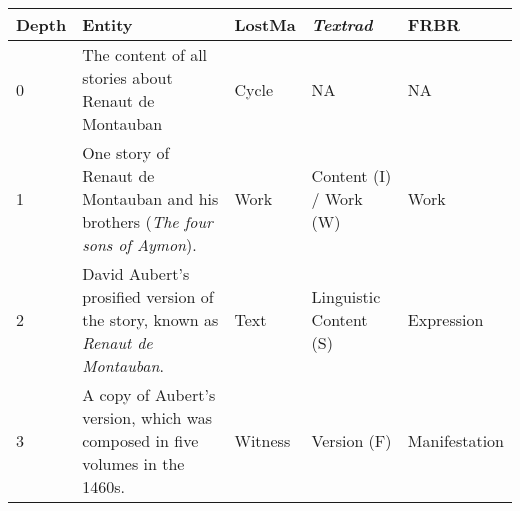 \begin{center}
    \begin{tabular}
        {|p{}|p{}|p{}|p{}|p{}|}
        \hline
        \textbf{Depth} & \textbf{Entity} & \textbf{LostMa} & \textbf{\textit{Textrad}} & \textbf{FRBR} \\
        \hline
        0 & The content of all stories about Renaut de Montauban & Cycle & NA & NA \\
        \hline
        1 & One story of Renaut de Montauban and his brothers (\textit{The four sons of Aymon}). & Work & Content (I) / Work (W) & Work \\
        \hline
        2 & David Aubert's prosified version of the story, known as \textit{Renaut de Montauban}. & Text & Linguistic Content (S) & Expression  \\
        \hline
        3 & A copy of Aubert's version, which was composed in five volumes in the 1460s. & Witness & Version (F) & Manifestation \\
        \hline
    \end{tabular}
\end{center}